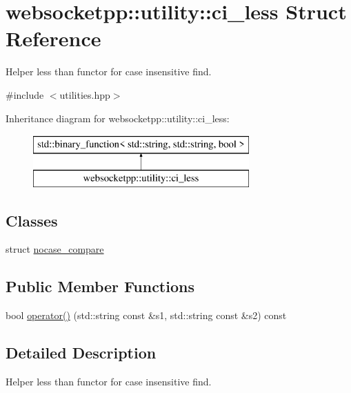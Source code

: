 \hypertarget{structwebsocketpp_1_1utility_1_1ci__less}{}\section{websocketpp\+:\+:utility\+:\+:ci\+\_\+less Struct Reference}
\label{structwebsocketpp_1_1utility_1_1ci__less}


Helper less than functor for case insensitive find.  




{\ttfamily \#include $<$utilities.\+hpp$>$}

Inheritance diagram for websocketpp\+:\+:utility\+:\+:ci\+\_\+less\+:\begin{figure}[H]
\begin{center}
\leavevmode
\includegraphics[height=2.000000cm]{structwebsocketpp_1_1utility_1_1ci__less}
\end{center}
\end{figure}
\subsection*{Classes}
\begin{DoxyCompactItemize}
\item 
struct \hyperlink{structwebsocketpp_1_1utility_1_1ci__less_1_1nocase__compare}{nocase\+\_\+compare}
\end{DoxyCompactItemize}
\subsection*{Public Member Functions}
\begin{DoxyCompactItemize}
\item 
bool \hyperlink{structwebsocketpp_1_1utility_1_1ci__less_aeda898edb0f7779e8384e1adc71f61bf}{operator()} (std\+::string const \&s1, std\+::string const \&s2) const 
\end{DoxyCompactItemize}


\subsection{Detailed Description}
Helper less than functor for case insensitive find. 

